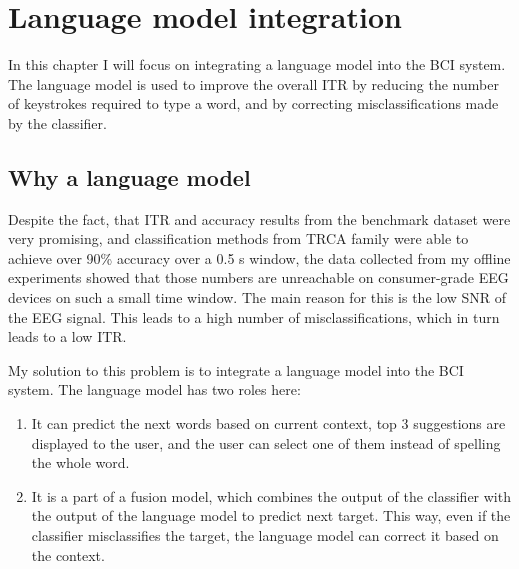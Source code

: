 
\chapter{Language model integration}
\label{ch:language}

In this chapter I will focus on integrating a language model into the \ac{BCI} system. 
The language model is used to improve the overall \ac{ITR} by reducing the number of 
keystrokes required to type a word, and by correcting misclassifications made by the classifier.

\section{Why a language model}
\label{sec:why-lm}

Despite the fact, that \ac{ITR} and accuracy results from the benchmark dataset were 
very promising, and classification methods from TRCA family were able to achieve over 
90\% accuracy over a 0.5 s window, the data collected from my offline experiments showed that 
those numbers are unreachable on consumer-grade EEG devices on such a small time window. The main reason for this 
is the low \ac{SNR} of the EEG signal. This leads to a high number of 
misclassifications, which in turn leads to a low \ac{ITR}. 

My solution to this problem is to integrate a language model into the \ac{BCI} system.
The language model has two roles here:
\begin{enumerate}
    \item It can predict the next words based on current context, top 3 suggestions 
    are displayed to the user, and the user can select one of them instead of spelling the whole word.
    \item It is a part of a fusion model, which combines the output of the classifier 
    with the output of the language model to predict next target. 
    This way, even if the classifier misclassifies the target, the language model can correct it based on the context.
\end{enumerate}

